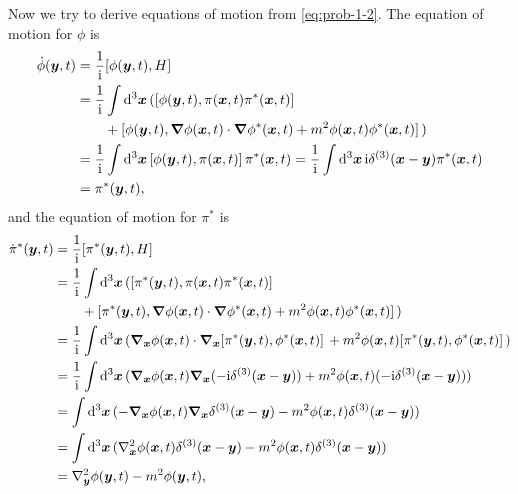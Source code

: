 \documentclass[hyperref, a4paper]{article}
\newcommand*{\ii}{\mathrm{i}}
\begin{document}
\begin{itemize}
    Now we try to derive equations of motion from \eqref{eq:prob-1-2}.
    The equation of motion for $\phi$ is 
    \[
        \begin{aligned}
            \dot{\phi}(\vb*{y}, t) &= \frac{1}{\ii} \comm*{\phi(\vb*{y}, t)}{H} \\
            &= \frac{1}{\ii} \int \dd[3]{\vb*{x}} (\comm*{\phi(\vb*{y}, t)}{\pi(\vb*{x}, t) \pi^*(\vb*{x}, t)} \\
            &\quad \quad + \comm*{\phi(\vb*{y}, t)}{\grad{\phi(\vb*{x}, t)} \cdot \grad{\phi^*(\vb*{x}, t)} + m^2 \phi(\vb*{x}, t) \phi^*(\vb*{x}, t)}) \\
            &= \frac{1}{\ii} \int \dd[3]{\vb*{x}} \comm*{\phi(\vb*{y}, t)}{\pi(\vb*{x}, t)} \pi^*(\vb*{x}, t) = \frac{1}{\ii} \int \dd[3]{\vb*{x}} \ii \delta^{(3)}(\vb*{x} - \vb*{y}) \pi^*(\vb*{x} , t) \\
            &= \pi^*(\vb*{y} , t), 
        \end{aligned}
    \]
    and the equation of motion for $\pi^*$ is 
    \[
        \begin{aligned}
            \dot{\pi}^*(\vb*{y}, t) &= \frac{1}{\ii} \comm*{\pi^*(\vb*{y}, t)}{H} \\
            &= \frac{1}{\ii} \int \dd[3]{\vb*{x}}  (\comm*{\pi^*(\vb*{y}, t)}{\pi(\vb*{x}, t) \pi^*(\vb*{x}, t)} \\
            &\quad \quad + \comm*{\pi^*(\vb*{y}, t)}{\grad{\phi(\vb*{x}, t)} \cdot \grad{\phi^*(\vb*{x}, t)} + m^2 \phi(\vb*{x}, t) \phi^*(\vb*{x}, t)}) \\
            &= \frac{1}{\ii} \int \dd[3]{\vb*{x}} (\grad_{\vb*{x}}{\phi(\vb*{x}, t)} \cdot \grad_{\vb*{x}}{\comm*{\pi^*(\vb*{y}, t)}{\phi^*(\vb*{x}, t)}} + m^2 \phi(\vb*{x}, t) \comm*{\pi^*(\vb*{y}, t)}{\phi^*(\vb*{x}, t)}) \\
            &= \frac{1}{\ii} \int \dd[3]{\vb*{x}} ( \grad_{\vb*{x}} \phi(\vb*{x}, t ) \grad_{\vb*{x}} (-\ii \delta^{(3)}(\vb*{x} - \vb*{y})) + m^2 \phi(\vb*{x}, t) (- \ii \delta^{(3)}(\vb*{x} - \vb*{y})) ) \\
            &= \int \dd[3]{\vb*{x}} ( - \grad_{\vb*{x}} \phi(\vb*{x}, t ) \grad_{\vb*{x}} \delta^{(3)}(\vb*{x} - \vb*{y}) - m^2 \phi(\vb*{x}, t) \delta^{(3)}(\vb*{x} - \vb*{y}) ) \\
            &= \int \dd[3]{\vb*{x}} ( \laplacian_{\vb*{x}} \phi(\vb*{x}, t ) \delta^{(3)}(\vb*{x} - \vb*{y}) - m^2 \phi(\vb*{x}, t) \delta^{(3)}(\vb*{x} - \vb*{y}) ) \\
            &= \laplacian_{\vb*{y}} \phi(\vb*{y}, t) - m^2 \phi(\vb*{y}, t),

\end{aligned}\]
\end{itemize}
\end{document}
